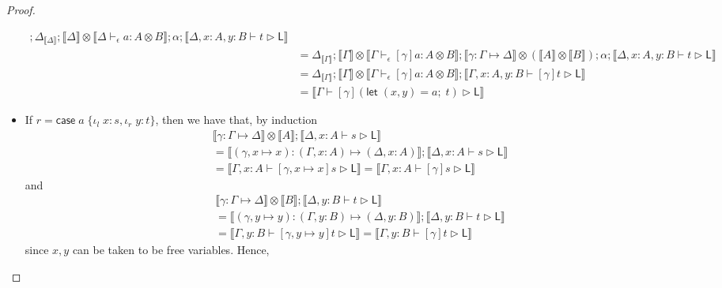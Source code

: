\documentclass[acmsmall,screen,review]{acmart}
\newcommand{\ms}[1]{\ensuremath{\mathsf{#1}}}
\newcommand{\lto}{:}
\newcommand{\linl}[1]{\iota_l\;{#1}}
\newcommand{\linr}[1]{\iota_r\;{#1}}
\newcommand{\letexpr}[3]{\ensuremath{\ms{let}\;#1 = #2;\;#3}}
\newcommand{\casestmt}[5]{\ms{case}\;#1\;\{\linl{#2} \lto #3, \linr{#4} \lto #5\}}
\newcommand{\bhyp}[2]{#1 : #2}
\newcommand{\hasty}[4]{#1 \vdash_{#2} #3: {#4}}
\newcommand{\haslb}[3]{#1 \vdash #2 \rhd #3}
\newcommand{\issubst}[3]{#1: #2 \mapsto #3}
\newcommand{\dnt}[1]{\llbracket{#1}\rrbracket}
\begin{document}
\begin{proof}
\begin{itemize}[leftmargin=*]
\begin{equation}
\begin{aligned}
        ; \Delta_{\dnt{\Delta}} 
        ; \dnt{\Delta} \otimes \dnt{\hasty{\Delta}{\epsilon}{a}{A \otimes B}}
        ; \alpha ; \dnt{\haslb{\Delta, \bhyp{x}{A}, \bhyp{y}{B}}{t}{\ms{L}}} \\
        &= \Delta_{\dnt{\Gamma}} 
        ; \dnt{\Gamma} \otimes \dnt{\hasty{\Gamma}{\epsilon}{[\gamma]a}{A \otimes B}}
        ; \dnt{\issubst{\gamma}{\Gamma}{\Delta}} \otimes (\dnt{A} \otimes \dnt{B}) ; \alpha
        ; \dnt{\haslb{\Delta, \bhyp{x}{A}, \bhyp{y}{B}}{t}{\ms{L}}} \\
        &= \Delta_{\dnt{\Gamma}}
        ; \dnt{\Gamma} \otimes \dnt{\hasty{\Gamma}{\epsilon}{[\gamma]a}{A \otimes B}}
        ; \dnt{\haslb{\Gamma, \bhyp{x}{A}, \bhyp{y}{B}}{[\gamma]t}{\ms{L}}} \\
        &= \dnt{\haslb{\Gamma}{[\gamma](\letexpr{(x, y)}{a}{t})}{\ms{L}}}
      \end{aligned}
    \end{equation}
    \item If $r = \casestmt{a}{x}{s}{y}{t}$, then we have that, by induction
    \begin{equation}
      \begin{aligned}
      & \dnt{\issubst{\gamma}{\Gamma}{\Delta}} \otimes \dnt{A} 
      ; \dnt{\haslb{\Delta, \bhyp{x}{A}}{s}{\ms{L}}}
      \\ &= \dnt{\issubst{(\gamma, x \mapsto x)}{(\Gamma, \bhyp{x}{A})}{(\Delta, \bhyp{x}{A})}}
      ; \dnt{\haslb{\Delta, \bhyp{x}{A}}{s}{\ms{L}}}
      \\ &= \dnt{\haslb{\Gamma, \bhyp{x}{A}}{[\gamma, x \mapsto x]s}{\ms{L}}}
          = \dnt{\haslb{\Gamma, \bhyp{x}{A}}{[\gamma]s}{\ms{L}}}
      \end{aligned}
    \end{equation}
    and
    \begin{equation}
      \begin{aligned}
      & \dnt{\issubst{\gamma}{\Gamma}{\Delta}} \otimes \dnt{B} 
      ; \dnt{\haslb{\Delta, \bhyp{y}{B}}{t}{\ms{L}}}
      \\ &= \dnt{\issubst{(\gamma, y \mapsto y)}{(\Gamma, \bhyp{y}{B})}{(\Delta, \bhyp{y}{B})}}
      ; \dnt{\haslb{\Delta, \bhyp{y}{B}}{t}{\ms{L}}}
      \\ &= \dnt{\haslb{\Gamma, \bhyp{y}{B}}{[\gamma, y \mapsto y]t}{\ms{L}}}
          = \dnt{\haslb{\Gamma, \bhyp{y}{B}}{[\gamma]t}{\ms{L}}}
      \end{aligned}
    \end{equation}
    since $x, y$ can be taken to be free variables. Hence,

\end{itemize}
\end{proof}
\end{document}
